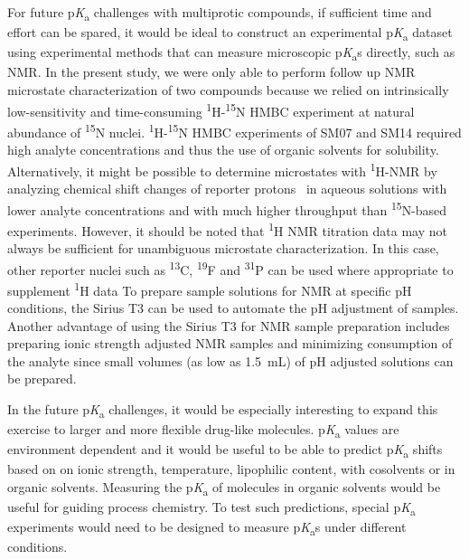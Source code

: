 \documentclass[9pt,lineno]{elife}
\newcommand{\pKa}{p\textit{K}\textsubscript{a}}
\begin{document}
For future \pKa{} challenges with multiprotic compounds, if sufficient time and effort can be spared, it would be ideal to construct an experimental \pKa{} dataset using experimental methods that can measure microscopic \pKa{}s directly, such as NMR. 
In the present study, we were only able to perform follow up NMR microstate characterization of two compounds  because we relied on intrinsically low-sensitivity and time-consuming \textsuperscript{1}H-\textsuperscript{15}N HMBC experiment at natural abundance of \textsuperscript{15}N nuclei. 
\textsuperscript{1}H-\textsuperscript{15}N HMBC experiments of SM07 and SM14 required high analyte concentrations and thus the use of organic solvents for solubility. 
Alternatively, it might be possible to determine microstates with \textsuperscript{1}H-NMR by analyzing chemical shift changes of reporter protons~\citep{bezencon_pka_2014} in aqueous solutions with lower analyte concentrations and with much higher throughput than \textsuperscript{15}N-based experiments. However, it should be noted that \textsuperscript{1}H NMR titration data may not always be sufficient for unambiguous microstate characterization. In this case, other reporter nuclei such as \textsuperscript{13}C, \textsuperscript{19}F and \textsuperscript{31}P can be used where appropriate to supplement \textsuperscript{1}H data
To prepare sample solutions for NMR at specific pH conditions, the Sirius T3 can be used to automate the pH adjustment of samples. 
Another advantage of using the Sirius T3 for NMR sample preparation includes preparing ionic strength adjusted NMR samples and minimizing consumption of the analyte since small volumes (as low as 1.5~mL) of pH adjusted solutions can be prepared. 


In the future \pKa{} challenges, it would be especially interesting to expand this exercise to larger and more flexible drug-like molecules. 
\pKa{} values are environment dependent and it would be useful to be able to predict \pKa{} shifts based on on ionic strength, temperature, lipophilic content, with cosolvents or in organic solvents. 
Measuring the \pKa{} of molecules in organic solvents would be useful for guiding process chemistry. 
To test such predictions, special \pKa{} experiments would need to be designed to measure \pKa{}s under different conditions.
\end{document}
